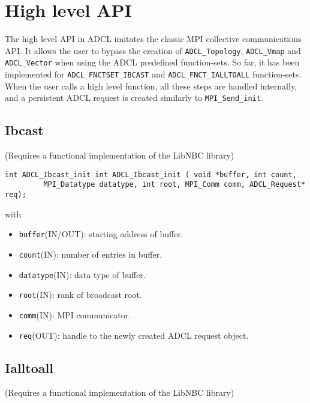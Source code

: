 \section{High level API}


The high level API in ADCL imitates the classic MPI collective communications API. It allows the user to bypass the creation of {\tt ADCL\_Topology}, {\tt ADCL\_Vmap} and {\tt ADCL\_Vector} when using the ADCL predefined function-sets. So far, it has been implemented for {\tt ADCL\_FNCTSET\_IBCAST} and {\tt ADCL\_FNCT\_IALLTOALL} function-sets. When the user calls a high level function, all these steps are handled internally, and a persistent ADCL request is created similarly to {\tt MPI\_Send\_init}.

\subsection{Ibcast}

(Requires a functional implementation of the LibNBC library)

\begin{verbatim}
int ADCL_Ibcast_init int ADCL_Ibcast_init ( void *buffer, int count,
         MPI_Datatype datatype, int root, MPI_Comm comm, ADCL_Request* req);
\end{verbatim}
with
\begin{itemize}
\item {\tt buffer}(IN/OUT): starting address of buffer.
\item {\tt count}(IN): number of entries in buffer.
\item {\tt datatype}(IN): data type of buffer.
\item {\tt root}(IN): rank of broadcast root.
\item {\tt comm}(IN): MPI communicator.
\item {\tt req}(OUT): handle to the newly created ADCL request object.
\end{itemize}

\subsection{Ialltoall}

(Requires a functional implementation of the LibNBC library)


